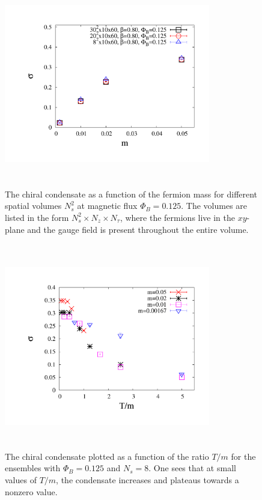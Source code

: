 \documentclass[aps,prd,twocolumn,showpacs,superscriptaddress,groupedaddress]{revtex4}  %
\begin{document}
\begin{figure}
\vspace{-1.2cm}
\includegraphics[height=9cm,width=9cm]{pbp_vs_m_PHI0125_volcompare_3_graphene_paper.pdf} 
\vspace{-1.25cm}
\caption{The chiral condensate as a function of the fermion mass for different spatial volumes $N^2_s$ at magnetic flux $\Phi_B=0.125$. The volumes are listed in the form $N_s^2\times N_z \times N_{\tau}$, where the fermions live in the $xy$-plane and the gauge field is present throughout the entire volume.}
\label{PBPVolume}
\end{figure}

\begin{figure}
\vspace{-1.2cm}
 \includegraphics[height=9cm,width=9cm]{pbp_vs_TdivM_PHI0125_zoom_graphene_paper_new.pdf} 
 \vspace{-1.25cm}
\caption{The chiral condensate plotted as a function of the ratio $T/m$ for the ensembles with $\Phi_B=0.125$ and $N_s=8$. One sees that at small values of $T/m$, the condensate increases and plateaus towards a nonzero value.}
\label{PBPvsTdivM}
\end{figure}
\end{document}
